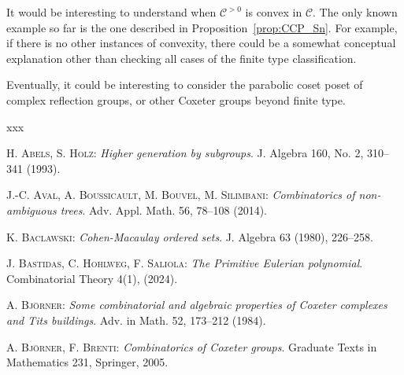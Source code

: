 \documentclass[11pt]{article}
\theoremstyle{definition}
\newcommand{\CC}{\mathcal{C}}
\newcommand{\CCP}{\mathcal{C}^{>0}}
\begin{document}
It would be interesting to understand when $\CCP$ is convex in $\CC$.  The only known example so far is the one described in Proposition~\ref{prop:CCP_Sn}.  For example, if there is no other instances of convexity, there could be a somewhat conceptual explanation other than checking all cases of the finite type classification. 

Eventually, it could be interesting to consider the parabolic coset poset of complex reflection groups, or other Coxeter groups beyond finite type.

\small

\begin{thebibliography}{xxx}

    \textsc{H. Abels, S. Holz}:
    {\it Higher generation by subgroups}.
    J. Algebra 160, No. 2, 310--341 (1993).



    \textsc{J.-C. Aval, A. Boussicault, M. Bouvel, M. Silimbani}:
    {\it Combinatorics of non-ambiguous trees}.
    Adv. Appl. Math. 56, 78--108 (2014).

  \textsc{K. Baclawski}:
  {\it Cohen-Macaulay ordered sets}.
  J. Algebra 63 (1980), 226--258.


    \textsc{J. Bastidas, C. Hohlweg, F. Saliola}:
    {\it The Primitive Eulerian polynomial}.
    Combinatorial Theory 4(1), (2024).

    \textsc{A. Björner}:
    {\it Some combinatorial and algebraic properties of {C}oxeter complexes and {T}its buildings}.
    Adv. in Math. 52, 173--212  (1984).

    \textsc{A. Björner, F. Brenti}:
    {\it Combinatorics of Coxeter groups}. Graduate Texts in Mathematics 231, Springer, 2005.



\end{thebibliography}
\end{document}

